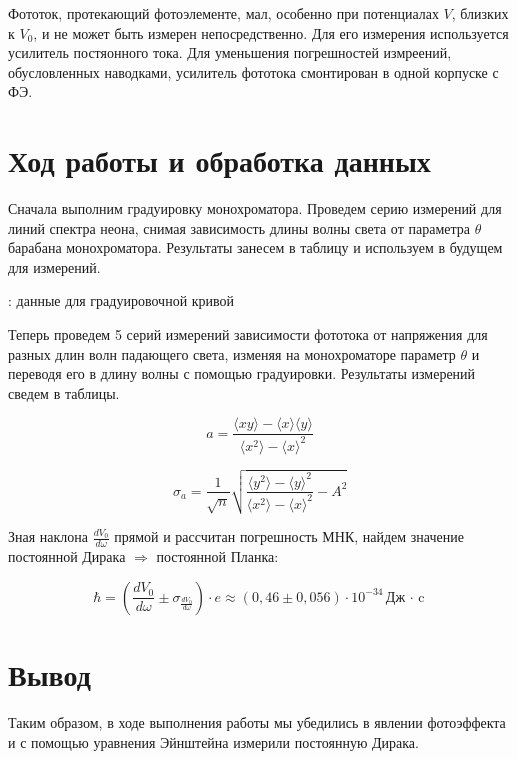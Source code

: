 \documentclass[15pt,a5paper,reqno]{article}
\begin{document}
	Фототок, протекающий  фотоэлементе, мал, особенно при потенциалах $V$, близких к $V_0$, и не может быть измерен непосредственно. Для его измерения используется усилитель постяонного тока. Для уменьшения погрешностей измреений,
	обусловленных наводками, усилитель фототока смонтирован в одной корпуске с ФЭ.
	
	\section{Ход работы и обработка данных}

	Сначала выполним градуировку монохроматора. Проведем серию измерений для линий спектра неона, снимая зависимость длины волны света от параметра $ \theta $ барабана монохроматора.
	Результаты занесем в таблицу и используем в будущем для измерений.
	\begin{table}[h!]
        \centering
        
        \caption{: данные для градуировочной кривой}
    	\label{tb_1}
	\end{table}

	Теперь проведем 5 серий измерений зависимости фототока от напряжения для разных длин волн падающего света, изменяя на монохроматоре параметр $ \theta $ и переводя его в длину волны с помощью градуировки.
	Результаты измерений сведем в таблицы.

	\begin{equation}\label{ols}
		a = \dfrac{\langle xy \rangle - \langle x \rangle \langle y \rangle}{\langle x^2 \rangle - \langle x \rangle^2}
	\end{equation}

	\begin{equation}\label{ols_err}
		\sigma_a = \dfrac{1}{\sqrt{n}}\sqrt{\dfrac{\langle y^2 \rangle - \langle y \rangle^2}{\langle x^2 \rangle - \langle x \rangle^2} - A^2}
	\end{equation}

	Зная наклона $\frac{dV_0}{d\omega}$ прямой и рассчитан погрешность МНК, найдем значение постоянной Дирака $\Rightarrow$ постоянной Планка:

	\[ \hbar = (\frac{dV_0}{d\omega} \pm \sigma_{\frac{dV_0}{d\omega}} ) \cdot e  \approx (0,46 \pm 0,056) \cdot 10^{-34} \text{Дж $\cdot$ c} \]

	\section{Вывод}

	Таким образом, в ходе выполнения работы мы убедились в явлении фотоэффекта и с помощью уравнения Эйнштейна измерили постоянную Дирака. 
\end{document}
